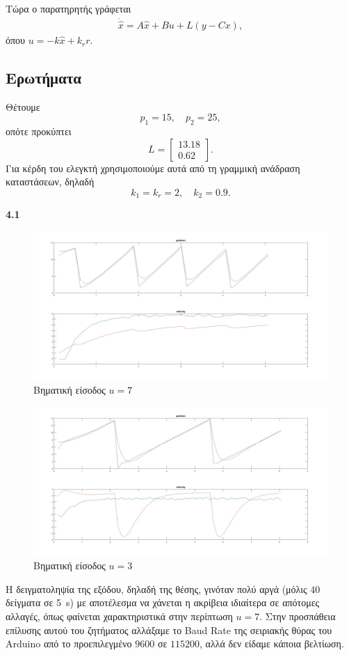 \documentclass[12pt]{article}
\begin{document}
Τώρα ο παρατηρητής γράφεται
\begin{align*}
    \dot{\hat{x}} = A\hat{x} + Bu + L(y - Cx), 
\end{align*}
όπου \(u = -k\hat{x} + k_r r\). 

\subsection*{Ερωτήματα}
Θέτουμε 
\begin{equation*}
    p_1 = 15, \quad p_2 = 25, 
\end{equation*}
οπότε προκύπτει 
\begin{equation*}
    L = \begin{bmatrix}
        13.18 \\
        0.62
    \end{bmatrix}.
\end{equation*}
Για κέρδη του ελεγκτή χρησιμοποιούμε αυτά από τη γραμμική ανάδραση καταστάσεων, δηλαδή
\begin{equation*}
    k_1 = k_r = 2, \quad k_2 = 0.9.
\end{equation*}

\textbf{4.1} 
\begin{figure}[H]
    \centering
    \caption*{Βηματική είσοδος \(u = 7\)}
    \includegraphics*[scale=0.25]{lab4a_u7_all.jpg}
\end{figure}
\begin{figure}[H]
    \centering
    \caption*{Βηματική είσοδος \(u = 3\)}
    \includegraphics*[scale=0.25]{lab4a_u3_all.jpg}
\end{figure}
Η δειγματοληψία της εξόδου, δηλαδή της θέσης, γινόταν πολύ αργά (μόλις \(40\) δείγματα σε \SI{5}{s}) με αποτέλεσμα να χάνεται η ακρίβεια ιδιαίτερα σε απότομες αλλαγές, όπως φαίνεται χαρακτηριστικά στην περίπτωση \(u = 7\). Στην προσπάθεια επίλυσης αυτού του ζητήματος αλλάξαμε το Baud Rate της σειριακής θύρας του Arduino από το προεπιλεγμένο \(9600\) σε \(115200\), αλλά δεν είδαμε κάποια βελτίωση. 
\end{document}
